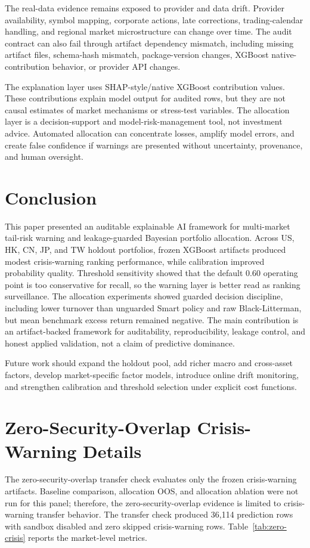 \documentclass{ieeeaccess}
\begin{document}
The real-data evidence remains exposed to provider and data drift. Provider availability, symbol mapping, corporate actions, late corrections, trading-calendar handling, and regional market microstructure can change over time. The audit contract can also fail through artifact dependency mismatch, including missing artifact files, schema-hash mismatch, package-version changes, XGBoost native-contribution behavior, or provider API changes.

The explanation layer uses SHAP-style/native XGBoost contribution values. These contributions explain model output for audited rows, but they are not causal estimates of market mechanisms or stress-test variables. The allocation layer is a decision-support and model-risk-management tool, not investment advice. Automated allocation can concentrate losses, amplify model errors, and create false confidence if warnings are presented without uncertainty, provenance, and human oversight.

\section{Conclusion}
\label{sec:conclusion}
This paper presented an auditable explainable AI framework for multi-market tail-risk warning and leakage-guarded Bayesian portfolio allocation. Across US, HK, CN, JP, and TW holdout portfolios, frozen XGBoost artifacts produced modest crisis-warning ranking performance, while calibration improved probability quality. Threshold sensitivity showed that the default 0.60 operating point is too conservative for recall, so the warning layer is better read as ranking surveillance. The allocation experiments showed guarded decision discipline, including lower turnover than unguarded Smart policy and raw Black-Litterman, but mean benchmark excess return remained negative. The main contribution is an artifact-backed framework for auditability, reproducibility, leakage control, and honest applied validation, not a claim of predictive dominance.

Future work should expand the holdout pool, add richer macro and cross-asset factors, develop market-specific factor models, introduce online drift monitoring, and strengthen calibration and threshold selection under explicit cost functions.

\appendices
\section{Zero-Security-Overlap Crisis-Warning Details}
\label{app:zero-overlap}
The zero-security-overlap transfer check evaluates only the frozen crisis-warning artifacts. Baseline comparison, allocation OOS, and allocation ablation were not run for this panel; therefore, the zero-security-overlap evidence is limited to crisis-warning transfer behavior. The transfer check produced 36,114 prediction rows with sandbox disabled and zero skipped crisis-warning rows. Table~\ref{tab:zero-crisis} reports the market-level metrics.
\end{document}
